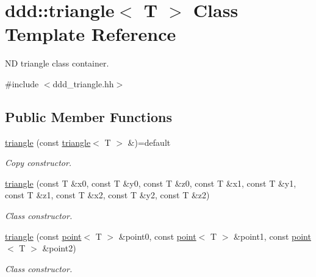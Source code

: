 \hypertarget{classddd_1_1triangle}{}\section{ddd\+:\+:triangle$<$ T $>$ Class Template Reference}
\label{classddd_1_1triangle}


ND triangle class container.  




{\ttfamily \#include $<$ddd\+\_\+triangle.\+hh$>$}

\subsection*{Public Member Functions}
\begin{DoxyCompactItemize}
\item 
\mbox{\label{classddd_1_1triangle_a3f1ab930b26ec606d8979a9c191a2722}} 
\hyperlink{classddd_1_1triangle_a3f1ab930b26ec606d8979a9c191a2722}{triangle} (const \hyperlink{classddd_1_1triangle}{triangle}$<$ T $>$ \&)=default
\begin{DoxyCompactList}\small\item\em Copy constructor. \end{DoxyCompactList}\item 
\mbox{\label{classddd_1_1triangle_ad19b3fc3d0a7997a6ab0400901743190}} 
\hyperlink{classddd_1_1triangle_ad19b3fc3d0a7997a6ab0400901743190}{triangle} (const T \&x0, const T \&y0, const T \&z0, const T \&x1, const T \&y1, const T \&z1, const T \&x2, const T \&y2, const T \&z2)
\begin{DoxyCompactList}\small\item\em Class constructor. \end{DoxyCompactList}\item 
\hyperlink{classddd_1_1triangle_afca480ce032f9e6ba7058c6817374ef8}{triangle} (const \hyperlink{classddd_1_1point}{point}$<$ T $>$ \&point0, const \hyperlink{classddd_1_1point}{point}$<$ T $>$ \&point1, const \hyperlink{classddd_1_1point}{point}$<$ T $>$ \&point2)
\begin{DoxyCompactList}\small\item\em Class constructor. \end{DoxyCompactList}\item 
\mbox{\label{classddd_1_1triangle_ae17a51e842e44cfb3061bdca7e64bc11}} 

\end{DoxyCompactItemize}
